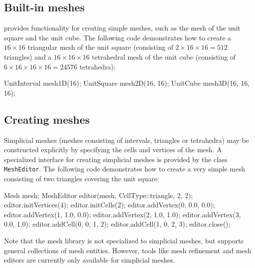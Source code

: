 \subsection{Built-in meshes}

\dolfin{} provides functionality for creating simple meshes, such as
the mesh of the unit square and the unit cube. The following code
demonstrates how to create a $16\times 16$ triangular mesh of the unit square
(consisting of $2\times 16\times 16 = 512$ triangles) and a
$16\times 16\times 16$ tetrahedral mesh of the unit cube (consisting
of $6\times 16\times 16\times 16 = 24576$ tetrahedra):
\begin{code}
UnitInterval mesh1D(16);
UnitSquare mesh2D(16, 16);
UnitCube mesh3D(16, 16, 16);
\end{code}


\subsection{Creating meshes}

Simplicial meshes (meshes consisting of intervals, triangles or
tetrahedra) may be constructed explicitly by specifying the
cells and vertices of the mesh. A specialized interface for creating
simplicial meshes is provided by the class \texttt{MeshEditor}.
The following code demonstrates how to create a very simple mesh
consisting of two triangles covering the unit square:
\begin{code}
Mesh mesh;
MeshEditor editor(mesh, CellType::triangle, 2, 2);
editor.initVertices(4);
editor.initCells(2);
editor.addVertex(0, 0.0, 0.0);
editor.addVertex(1, 1.0, 0.0);
editor.addVertex(2, 1.0, 1.0);
editor.addVertex(3, 0.0, 1.0);
editor.addCell(0, 0, 1, 2);
editor.addCell(1, 0, 2, 3);
editor.close();
\end{code}
Note that the \dolfin{} mesh library is not specialized to simplicial
meshes, but supports general collections of mesh entities. However,
tools like mesh refinement and mesh editors are currently only
available for simplicial meshes.
